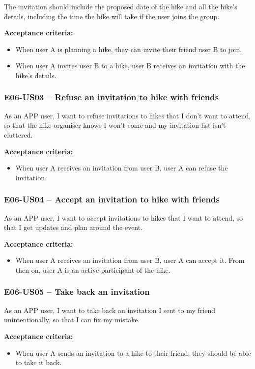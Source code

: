 The invitation should include the proposed date of the hike and all the hike's details, including the time the hike will take if the user joins the group.

\textbf{Acceptance criteria:}
\begin{itemize}
    \item When user A is planning a hike, they can invite their friend user B to join. 
    \item When user A invites user B to a hike, user B receives an invitation with the hike's details.
\end{itemize}

\subsubsection*{E06-US03 -- Refuse an invitation to hike with friends}
As an APP user, I want to refuse invitations to hikes that I don't want to attend, so that the hike organiser knows I won't come and my invitation list isn't cluttered.

\textbf{Acceptance criteria:}
\begin{itemize}
    \item When user A receives an invitation from user B, user A can refuse the invitation.
\end{itemize}

\subsubsection*{E06-US04 -- Accept an invitation to hike with friends}
As an APP user, I want to accept invitations to hikes that I want to attend, so that I get updates and plan around the event.

\textbf{Acceptance criteria:}
\begin{itemize}
    \item When user A receives an invitation from user B, user A can accept it. From then on, user A is an active participant of the hike.
\end{itemize}

\subsubsection*{E06-US05 -- Take back an invitation}
As an APP user, I want to take back an invitation I sent to my friend unintentionally, so that I can fix my mistake.

\textbf{Acceptance criteria:}
\begin{itemize}
    \item When user A sends an invitation to a hike to their friend, they should be able to take it back.
\end{itemize}

